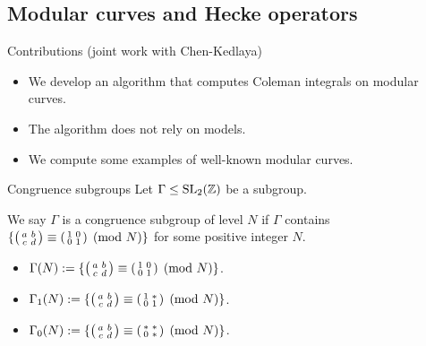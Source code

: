 \subsection{Modular curves and Hecke operators}

\begin{frame}{Contributions (joint work with Chen-Kedlaya)}
\begin{itemize}
\item We develop an algorithm that computes Coleman integrals on modular curves.
\item The algorithm does not rely on models.
\item We compute some examples of well-known modular curves.
\end{itemize}
\end{frame}

\begin{frame}{Congruence subgroups}
Let $\Gamma \leq \operatorname{SL}_2(\mathbb{Z})$ be a subgroup. 

\begin{definition}
We say $\Gamma$ is a congruence subgroup of level $N$ if $\Gamma$ contains $\{ \begin{psmallmatrix} a & b \\ c & d \end{psmallmatrix} \equiv \begin{psmallmatrix} 1 & 0 \\ 0 & 1 \end{psmallmatrix} \pmod{N} \}$ for some positive integer $N$.
\end{definition}

\begin{itemize}
\item $\Gamma(N) := \{ \begin{psmallmatrix} a & b \\ c & d \end{psmallmatrix} \equiv \begin{psmallmatrix} 1 & 0 \\ 0 & 1 \end{psmallmatrix} \pmod{N} \}$.
\item $\Gamma_1(N) := \{ \begin{psmallmatrix} a & b \\ c & d \end{psmallmatrix} \equiv \begin{psmallmatrix} 1 & \ast \\ 0 & 1 \end{psmallmatrix} \pmod{N} \}$.
\item $\Gamma_0(N) := \{ \begin{psmallmatrix} a & b \\ c & d \end{psmallmatrix} \equiv \begin{psmallmatrix} \ast & \ast \\ 0 & \ast \end{psmallmatrix} \pmod{N} \}$.
\end{itemize}
\end{frame}

